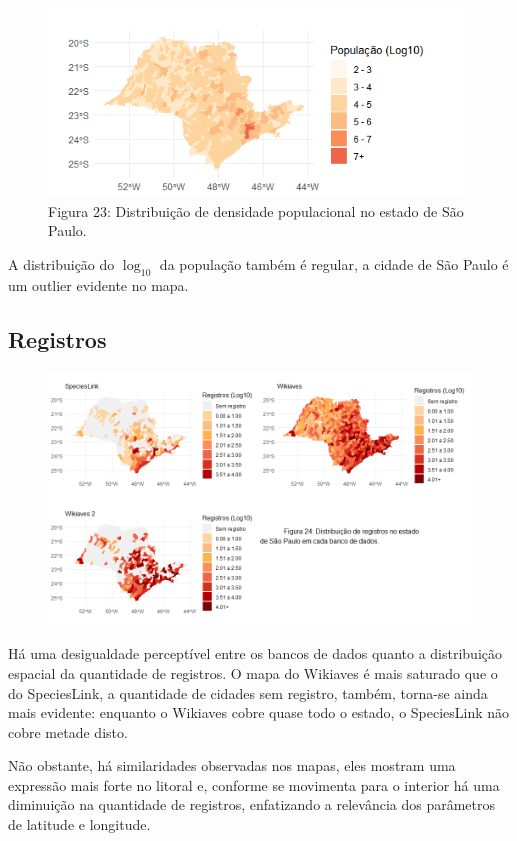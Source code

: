 \documentclass[12pt]{extarticle}
\newenvironment{resposta}{ \color{mygray}}{}
\begin{document}
\newpage

\begin{figure}[h!]
\centering
\includegraphics[height = 5cm]{Imagens/M03.png}
\\{\scriptsize Figura 23: Distribuição de densidade populacional no estado de São Paulo.}
\end{figure}

\begin{resposta}
A distribuição do $\log_{10}$ da população também é regular, a cidade de São Paulo é um outlier evidente no mapa.
\end{resposta}

\subsection {Registros}

\begin{figure}[h!]
\centering
\includegraphics[width=17cm]{Imagens/M04.png}
\end{figure}

\begin{resposta}
Há uma desigualdade perceptível entre os bancos de dados quanto a distribuição espacial da quantidade de registros. O mapa do Wikiaves é mais saturado que o do SpeciesLink, a quantidade de cidades sem registro, também, torna-se ainda mais evidente: enquanto o Wikiaves cobre quase todo o estado, o SpeciesLink não cobre metade disto. 

Não obstante, há similaridades observadas nos mapas, eles mostram uma expressão mais forte no litoral e, conforme se movimenta para  o interior há uma diminuição na quantidade de registros, enfatizando a relevância dos parâmetros de latitude e longitude.
\end{resposta}
\end{document}
